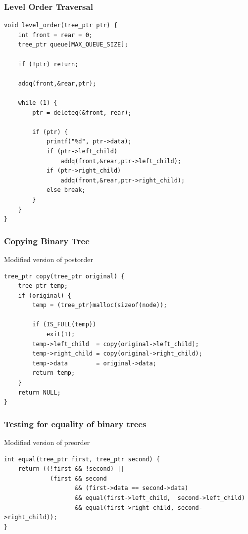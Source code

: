 \documentclass[newPxFont,sthlmFooter,nooffset]{beamer}
\begin{document}
\begin{frame}[t, fragile]
  \frametitle{Level Order Traversal}
  \begin{lstlisting}
void level_order(tree_ptr ptr) { 
    int front = rear = 0;
    tree_ptr queue[MAX_QUEUE_SIZE]; 

    if (!ptr) return; 

    addq(front,&rear,ptr);

    while (1) {
        ptr = deleteq(&front, rear); 

        if (ptr) {
            printf("%d", ptr->data); 
            if (ptr->left_child)
                addq(front,&rear,ptr->left_child); 
            if (ptr->right_child)
                addq(front,&rear,ptr->right_child); 
            else break;
        }
    } 
}    
  \end{lstlisting}
\end{frame}


\begin{frame}[t, fragile]
  \frametitle{Copying Binary Tree}
Modified version of postorder
\begin{lstlisting}
tree_ptr copy(tree_ptr original) {
    tree_ptr temp; 
    if (original) {
        temp = (tree_ptr)malloc(sizeof(node)); 

        if (IS_FULL(temp)) 
            exit(1); 
        temp->left_child  = copy(original->left_child); 
        temp->right_child = copy(original->right_child); 
        temp->data        = original->data; 
        return temp;
    }
    return NULL; 
}  
\end{lstlisting}
\end{frame}


\begin{frame}[t, fragile]
  \frametitle{Testing for equality of binary trees}
Modified version of preorder
\begin{lstlisting}
int equal(tree_ptr first, tree_ptr second) {
    return ((!first && !second) || 
             (first && second 
                    && (first->data == second->data) 
                    && equal(first->left_child,  second->left_child) 
                    && equal(first->right_child, second->right_child));
}
\end{lstlisting}
\end{frame}
\end{document}
